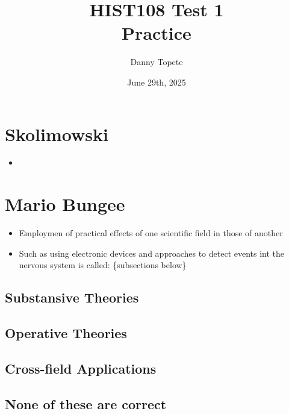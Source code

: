 \documentclass{article}
\title{HIST108 Test 1\\ Practice}
\author{Danny Topete}
\date{June 29th, 2025}
\begin{document}
\maketitle

\section{Skolimowski}
\begin{itemize}
  \item
\end{itemize}

\section{Mario Bungee}
\begin{itemize}
  \item Employmen of practical effects
    of one scientific field in those of another
  \item Such as using electronic devices and approaches to detect events
    int the nervous system is called: \{subsections below\}
\end{itemize}

\subsection{Substansive Theories}

\subsection{Operative Theories}

\subsection{Cross-field Applications}

\subsection{None of these are correct}
\end{document}
